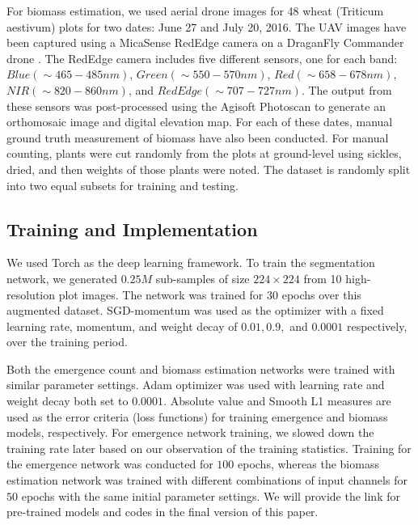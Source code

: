 \documentclass[10pt,twocolumn,letterpaper]{article}
\begin{document}
For biomass estimation, we used aerial drone images for 48 wheat (Triticum aestivum) plots for two dates: June 27 and July 20, 2016. The UAV images have been captured using a MicaSense RedEdge camera \cite{micasense} on a DraganFly Commander drone \cite{draganfly}. The RedEdge camera includes five different sensors, one for each band: $Blue (\sim 465-485 nm)$, $Green (\sim 550-570 nm)$, $Red (\sim 658-678 nm)$, $NIR (\sim 820-860 nm)$, and $Red Edge (\sim 707-727 nm)$. The output from these sensors was post-processed using the Agisoft Photoscan \cite{agisoft} to generate an orthomosaic image and digital elevation map. For each of these dates, manual ground truth measurement of biomass have also been conducted. For manual counting, plants were cut randomly from the plots at ground-level using sickles, dried, and then weights of those plants were noted. The dataset is randomly split into two equal subsets for training and testing.

\subsection{Training and Implementation}

We used Torch \cite{torch} as the deep learning framework. To train the segmentation network, we generated $0.25M$ sub-samples of size $224\times224$ from 10 high-resolution plot images. The network was trained for $30$ epochs over this augmented dataset. SGD-momentum was used as the optimizer with a fixed learning rate, momentum, and weight decay of $0.01, 0.9,$ and $0.0001$ respectively, over the training period.


Both the emergence count and biomass estimation networks were trained with similar parameter settings. Adam optimizer \cite{adam} was used with learning rate and weight decay both set to $0.0001$. Absolute value and Smooth L1 measures \cite{fast-rcnn} are used as the error criteria (loss functions) for training emergence and biomass models, respectively. For emergence network training, we slowed down the training rate later based on our observation of the training statistics. Training for the emergence network was conducted for $100$ epochs, whereas the biomass estimation network was trained with different combinations of input channels for $50$ epochs with the same initial parameter settings. We will provide the link for pre-trained models and codes in the final version of this paper.
\end{document}
